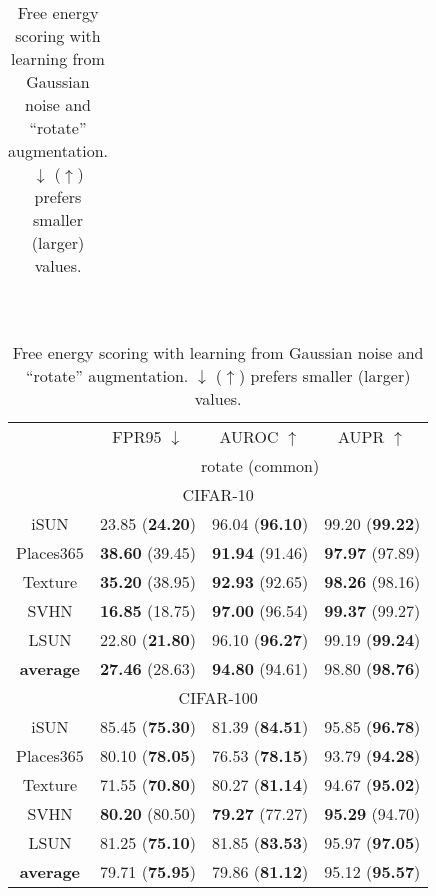 \documentclass{article}
\begin{document}
\begin{table}[t]
{{\begin{tabular}{c|ccc}
\end{tabular}
}}~~~~
\parbox{.47\linewidth}{
\centering
\caption{{Free energy scoring with learning from Gaussian noise and ``rotate'' augmentation. $\downarrow$ ($\uparrow$) prefers smaller (larger) values.}} \label{tab: eneregy rotate}
\vspace{5pt}
\scriptsize{
\begin{tabular}{c|ccc}
\toprule[1.5pt]
                   & FPR95 $\downarrow$     & AUROC $\uparrow$       & AUPR $\uparrow$      \\
                   \cline{2-4} 
\multirow{-2}{*}{} & \multicolumn{3}{c}{rotate (common)} \\
\midrule[0.6pt]
\multicolumn{4}{c}{\cellcolor{greyL}CIFAR-10} \\
\midrule[0.6pt]
iSUN               & 23.85 (\textbf{24.20}) & 96.04 (\textbf{96.10}) & 99.20 (\textbf{99.22}) \\ 
Places$365$        & \textbf{38.60} (39.45) & \textbf{91.94} (91.46) & \textbf{97.97} (97.89) \\
Texture            & \textbf{35.20} (38.95) & \textbf{92.93} (92.65) & \textbf{98.26} (98.16) \\
SVHN               & \textbf{16.85} (18.75) & \textbf{97.00} (96.54) & \textbf{99.37} (99.27) \\
LSUN               & 22.80 (\textbf{21.80}) & 96.10 (\textbf{96.27}) & 99.19 (\textbf{99.24}) \\
\midrule
\textbf{average}   & \textbf{27.46} (28.63) & \textbf{94.80} (94.61) & {98.80} (\textbf{98.76}) \\ \midrule[1pt]
\multicolumn{4}{c}{\cellcolor{greyL}CIFAR-100} \\
\midrule[1pt]
iSUN               & 85.45 (\textbf{75.30}) & 81.39 (\textbf{84.51}) & 95.85 (\textbf{96.78}) \\ 
Places$365$        & 80.10 (\textbf{78.05}) & 76.53 (\textbf{78.15}) & 93.79 (\textbf{94.28}) \\
Texture            & 71.55 (\textbf{70.80}) & 80.27 (\textbf{81.14}) & 94.67 (\textbf{95.02}) \\
SVHN               & \textbf{80.20} (80.50) & \textbf{79.27} (77.27) & \textbf{95.29} (94.70) \\
LSUN               & 81.25 (\textbf{75.10}) & 81.85 (\textbf{83.53}) & 95.97 (\textbf{97.05}) \\
\midrule
\textbf{average}   & 79.71 (\textbf{75.95}) & 79.86 (\textbf{81.12}) & 95.12 (\textbf{95.57}) \\ \bottomrule[1.5pt]      
\end{tabular}
}}
\end{table}
\end{document}
